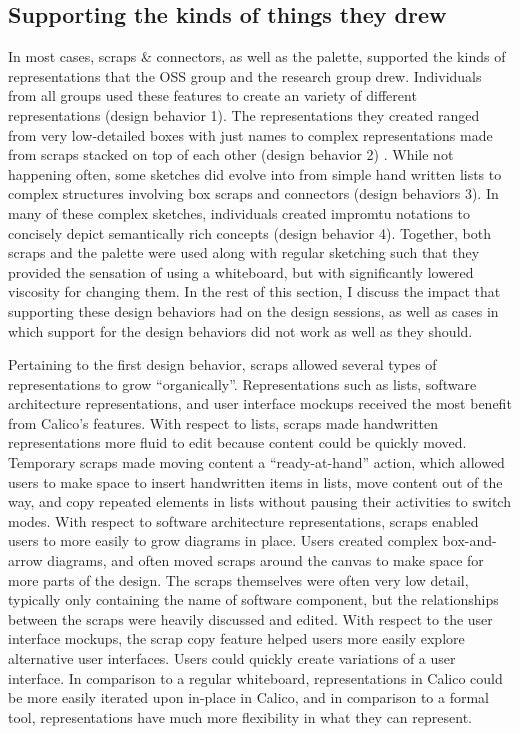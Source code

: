 \documentclass[12pt,fleqn]{ucithesis}
\begin{document}
\subsection{Supporting the kinds of things they drew}

In most cases, scraps \& connectors, as well as the palette, supported the kinds of representations that the OSS group and the research group drew. Individuals from all groups used these features to create an variety of different representations (design behavior 1). The representations they created ranged from very low-detailed boxes with just names to complex representations made from scraps stacked on top of each other (design behavior 2) . While not happening often, some sketches did evolve into from simple hand written lists to complex structures involving box scraps and connectors (design behaviors 3). In many of these complex sketches, individuals created impromtu notations to concisely depict semantically rich concepts (design behavior 4). Together, both scraps and the palette were used along with regular sketching such that they provided the sensation of using a whiteboard, but with significantly lowered viscosity for changing them. In the rest of this section, I discuss the impact that supporting these design behaviors had on the design sessions, as well as cases in which support for the design behaviors did not work as well as they should. 

Pertaining to the first design behavior, scraps allowed several types of representations to grow ``organically''. Representations such as lists, software architecture representations, and user interface mockups received the most benefit from Calico's features. With respect to lists, scraps made handwritten representations more fluid to edit because content could be quickly moved. Temporary scraps made moving content a ``ready-at-hand'' action, which allowed users to make space to insert handwritten items in lists, move content out of the way, and copy repeated elements in lists without pausing their activities to switch modes. With respect to software architecture representations, scraps enabled users to more easily to grow diagrams in place. Users created complex box-and-arrow diagrams, and often moved scraps around the canvas to make space for more parts of the design. The scraps themselves were often very low detail, typically only containing the name of software component, but the relationships between the scraps were heavily discussed and edited. With respect to the user interface mockups, the scrap copy feature helped users more easily explore alternative user interfaces. Users could quickly create variations of a user interface. In comparison to a regular whiteboard, representations in Calico could be more easily iterated upon in-place in Calico, and in comparison to a formal tool, representations have much more flexibility in what they can represent.
\end{document}
